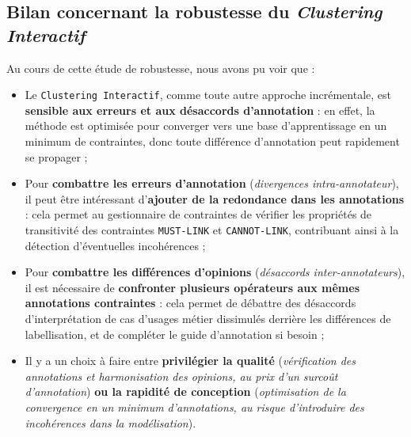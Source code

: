 	
	\subsection{Bilan concernant la robustesse du \textit{Clustering Interactif}}
	\label{section:4.6.4-ETUDE-ROBUSTESSE-MISE-EN-COMMUN}
	
		\begin{leftBarSummary}
			Au cours de cette étude de robustesse, nous avons pu voir que :
			\begin{itemize}
				\item[\itemok] Le \texttt{Clustering Interactif}, comme toute autre approche incrémentale, est \textbf{sensible aux erreurs et aux désaccords d'annotation} : en effet, la méthode est optimisée pour converger vers une base d'apprentissage en un minimum de contraintes, donc toute différence d'annotation peut rapidement se propager ;
				\item[\itemok] Pour \textbf{combattre les erreurs d'annotation} (\textit{divergences intra-annotateur}), il peut être intéressant d'\textbf{ajouter de la redondance dans les annotations} : cela permet au gestionnaire de contraintes de vérifier les propriétés de transitivité des contraintes \texttt{MUST-LINK} et \texttt{CANNOT-LINK}, contribuant ainsi à la détection d'éventuelles incohérences ;
				\item[\itemok] Pour \textbf{combattre les différences d'opinions} (\textit{désaccords inter-annotateurs}), il est nécessaire de \textbf{confronter plusieurs opérateurs aux mêmes annotations contraintes} : cela permet de débattre des désaccords d'interprétation de cas d'usages métier dissimulés derrière les différences de labellisation, et de compléter le guide d'annotation si besoin ;
				\item[\itemok] Il y a un choix à faire entre \textbf{privilégier la qualité} (\textit{vérification des annotations et harmonisation des opinions, au prix d'un surcoût d'annotation}) \textbf{ou la rapidité de conception} (\textit{optimisation de la convergence en un minimum d'annotations, au risque d'introduire des incohérences dans la modélisation}).
			\end{itemize}
		\end{leftBarSummary}